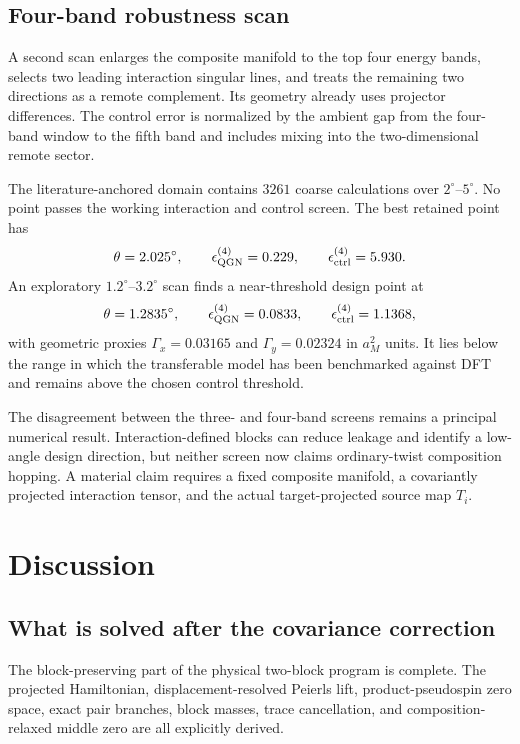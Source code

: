 \documentclass[11pt]{article}
\theoremstyle{remark}
\begin{document}
\subsection{Four-band robustness scan}

A second scan enlarges the composite manifold to the top four energy bands, selects two leading interaction singular lines, and treats the remaining two directions as a remote complement.  Its geometry already uses projector differences.  The control error is normalized by the ambient gap from the four-band window to the fifth band and includes mixing into the two-dimensional remote sector.

The literature-anchored domain contains $3261$ coarse calculations over $2^\circ$--$5^\circ$.  No point passes the working interaction and control screen.  The best retained point has
\begin{equation}
 \theta=2.025^\circ,
 \qquad
 \epsilon_{\rm QGN}^{(4)}=0.229,
 \qquad
 \epsilon_{\rm ctrl}^{(4)}=5.930.
\end{equation}
An exploratory $1.2^\circ$--$3.2^\circ$ scan finds a near-threshold design point at
\begin{equation}
 \theta=1.2835^\circ,
 \qquad
 \epsilon_{\rm QGN}^{(4)}=0.0833,
 \qquad
 \epsilon_{\rm ctrl}^{(4)}=1.1368,
\end{equation}
with geometric proxies $\Gamma_x=0.03165$ and $\Gamma_y=0.02324$ in $a_M^2$ units.  It lies below the range in which the transferable model has been benchmarked against DFT and remains above the chosen control threshold.

The disagreement between the three- and four-band screens remains a principal numerical result.  Interaction-defined blocks can reduce leakage and identify a low-angle design direction, but neither screen now claims ordinary-twist composition hopping.  A material claim requires a fixed composite manifold, a covariantly projected interaction tensor, and the actual target-projected source map $T_i$.

\section{Discussion}
\label{sec:discussion}

\subsection{What is solved after the covariance correction}

The block-preserving part of the physical two-block program is complete.  The projected Hamiltonian, displacement-resolved Peierls lift, product-pseudospin zero space, exact pair branches, block masses, trace cancellation, and composition-relaxed middle zero are all explicitly derived.
\end{document}
